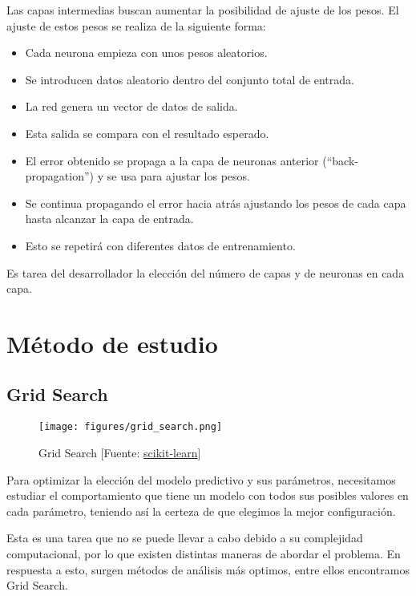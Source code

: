 	Las capas intermedias buscan aumentar la posibilidad de ajuste de los pesos. El ajuste de estos pesos se realiza de la siguiente forma:

	\begin{itemize}
		\item Cada neurona empieza con unos pesos aleatorios.
		\item Se introducen datos aleatorio dentro del conjunto total de entrada.
		\item La red genera un vector de datos de salida.
		\item Esta salida se compara con el resultado esperado.
		\item El error obtenido se propaga a la capa de neuronas anterior (``back-propagation'') y se usa para ajustar los pesos.
		\item Se continua propagando el error hacia atrás ajustando los pesos de cada capa hasta alcanzar la capa de entrada.
		\item Esto se repetirá con diferentes datos de entrenamiento.
 	\end{itemize}

	Es tarea del desarrollador la elección del número de capas y de neuronas en cada capa.

\section{Método de estudio}
\label{makereference4.4}
	\subsection{Grid Search}

	\begin{figure}[htb]
		\begin{center}
			\texttt{[image: figures/grid\_search.png]}
			\caption{Grid Search [Fuente: \href{www.scikit-learn.org}{scikit-learn}] \label{grid}}
		\end{center}
	\end{figure}

	Para optimizar la elección del modelo predictivo y sus parámetros, necesitamos estudiar el comportamiento que tiene un modelo con todos sus posibles valores en cada parámetro, teniendo así la certeza de que elegimos la mejor configuración.

	Esta es una tarea que no se puede llevar a cabo debido a su complejidad computacional, por lo que existen distintas maneras de abordar el problema. En respuesta a esto, surgen métodos de análisis más optimos, entre ellos encontramos Grid Search.

